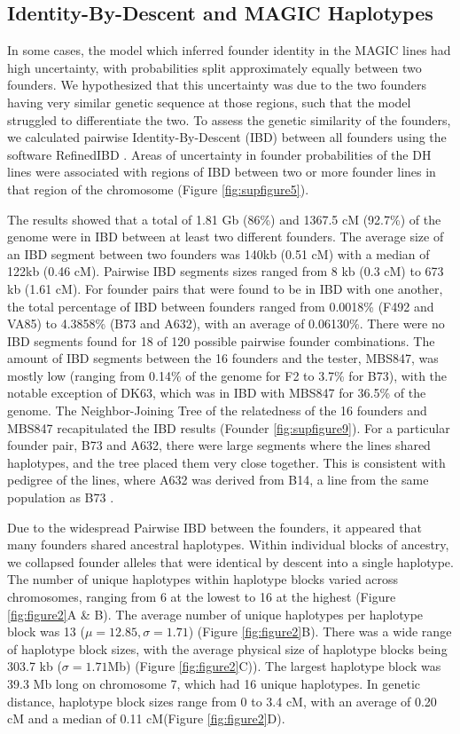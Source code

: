 \documentclass[article,9pt,twocolumn,twoside]{rilabRxiv}
\newcommand{\jri}[1]{{\small \textcolor{red}{#1}}}
\begin{document}
\subsection{Identity-By-Descent and MAGIC Haplotypes}
In some cases, the model which inferred founder identity in the MAGIC lines had high uncertainty, with probabilities split approximately equally between two founders.
We hypothesized that this uncertainty was due to the two founders having very similar genetic sequence at those regions, such that the model struggled to differentiate the two.
To assess the genetic similarity of the founders, we calculated pairwise Identity-By-Descent (IBD) between all founders using the software RefinedIBD \citep{Browning}.
Areas of uncertainty in founder probabilities of the DH lines were associated with regions of IBD between two or more founder lines in that region of the chromosome (Figure \ref{fig:supfigure5}).

The results showed that a total of 1.81 Gb (86\%) and 1367.5 cM (92.7\%) of the genome were in IBD between at least two different founders. %
The average size of an IBD segment between two founders was 140kb (0.51 cM) with a median of 122kb (0.46 cM). Pairwise IBD segments sizes ranged from 8 kb (0.3 cM) to  673 kb (1.61 cM).
For founder pairs that were found to be in IBD with one another, the total percentage of IBD between founders ranged from 0.0018\% (F492 and VA85) to 4.3858\% (B73 and A632), with an average of 0.06130\%.
There were no IBD segments found for 18 of 120 possible pairwise founder combinations.
The amount of IBD segments between the 16 founders and the tester, MBS847, was mostly low (ranging from 0.14\% of the genome for F2 to 3.7\% for B73), with the notable exception of DK63, which was in IBD with MBS847 for 36.5\% of the genome.
The Neighbor-Joining Tree of the relatedness of the 16 founders and MBS847 recapitulated the IBD results (Founder \ref{fig:supfigure9}).
For a particular founder pair, B73 and A632, there were large segments where the lines shared haplotypes, and the tree placed them very close together.
This is consistent with pedigree of the lines, where A632 was derived from B14, a line from the same population as B73 \citep{Lorenz}.

Due to the widespread Pairwise IBD between the founders, it appeared that many founders shared ancestral haplotypes.
Within individual blocks of ancestry, we collapsed founder alleles that were identical by descent into a single haplotype.
The number of unique haplotypes within haplotype blocks varied across chromosomes, ranging from 6 at the lowest to 16 at the highest (Figure  \ref{fig:figure2}A \& B).
The average number of unique haplotypes per haplotype block was 13 ($\mu = 12.85, \sigma =1.71$) (Figure \ref{fig:figure2}B).
There was a wide range of haplotype block sizes, with the average physical size of haplotype blocks being 303.7 kb ($\sigma =1.71$Mb) (Figure \ref{fig:figure2}C)).
The largest haplotype block was 39.3 Mb long on chromosome 7, which had 16 unique haplotypes.
In genetic distance, haplotype block sizes range from 0 to 3.4 cM, with an average of 0.20 cM and a median of 0.11 cM(Figure \ref{fig:figure2}D).
\end{document}
